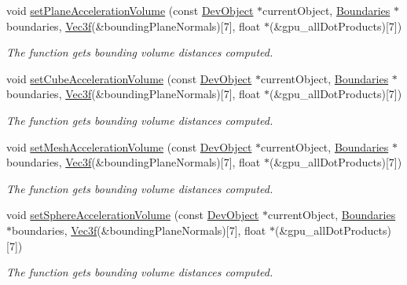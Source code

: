 \begin{DoxyCompactItemize}
\item 
void \hyperlink{group__intersection__test__prperties_ga684f41eb2add27e32a7c0115cdd6cce1}{set\+Plane\+Acceleration\+Volume} (const \hyperlink{class_dev_object}{Dev\+Object} $\ast$current\+Object, \hyperlink{class_boundaries}{Boundaries} $\ast$boundaries, \hyperlink{class_vec3}{Vec3f}(\&bounding\+Plane\+Normals)\mbox{[}7\mbox{]}, float $\ast$(\&gpu\+\_\+all\+Dot\+Products)\mbox{[}7\mbox{]})
\begin{DoxyCompactList}\small\item\em The function gets bounding volume distances computed. \end{DoxyCompactList}\item 
void \hyperlink{group__intersection__test__prperties_gabfac85fdf9d0cceb70aefa4c2ed71ad2}{set\+Cube\+Acceleration\+Volume} (const \hyperlink{class_dev_object}{Dev\+Object} $\ast$current\+Object, \hyperlink{class_boundaries}{Boundaries} $\ast$boundaries, \hyperlink{class_vec3}{Vec3f}(\&bounding\+Plane\+Normals)\mbox{[}7\mbox{]}, float $\ast$(\&gpu\+\_\+all\+Dot\+Products)\mbox{[}7\mbox{]})
\begin{DoxyCompactList}\small\item\em The function gets bounding volume distances computed. \end{DoxyCompactList}\item 
void \hyperlink{group__intersection__test__prperties_ga672ecbee3aea2f5567ad7a2611feef3e}{set\+Mesh\+Acceleration\+Volume} (const \hyperlink{class_dev_object}{Dev\+Object} $\ast$current\+Object, \hyperlink{class_boundaries}{Boundaries} $\ast$boundaries, \hyperlink{class_vec3}{Vec3f}(\&bounding\+Plane\+Normals)\mbox{[}7\mbox{]}, float $\ast$(\&gpu\+\_\+all\+Dot\+Products)\mbox{[}7\mbox{]})
\begin{DoxyCompactList}\small\item\em The function gets bounding volume distances computed. \end{DoxyCompactList}\item 
void \hyperlink{group__intersection__test__prperties_gafd2f15ce4a55fb0d8daee0bff024b67b}{set\+Sphere\+Acceleration\+Volume} (const \hyperlink{class_dev_object}{Dev\+Object} $\ast$current\+Object, \hyperlink{class_boundaries}{Boundaries} $\ast$boundaries, \hyperlink{class_vec3}{Vec3f}(\&bounding\+Plane\+Normals)\mbox{[}7\mbox{]}, float $\ast$(\&gpu\+\_\+all\+Dot\+Products)\mbox{[}7\mbox{]})
\begin{DoxyCompactList}\small\item\em The function gets bounding volume distances computed. \end{DoxyCompactList}\item 

\end{DoxyCompactItemize}
